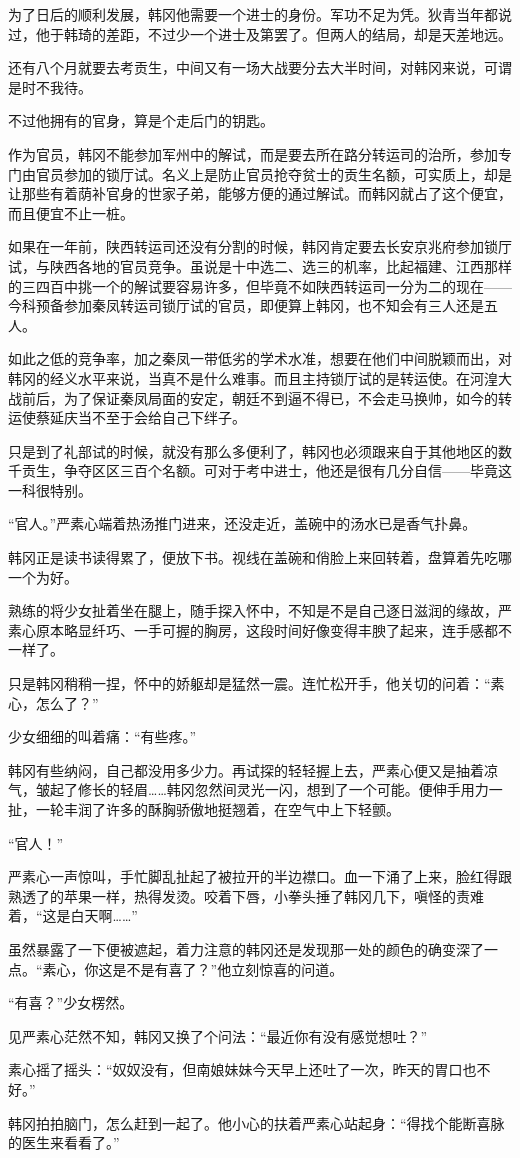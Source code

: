 为了日后的顺利发展，韩冈他需要一个进士的身份。军功不足为凭。狄青当年都说过，他于韩琦的差距，不过少一个进士及第罢了。但两人的结局，却是天差地远。

还有八个月就要去考贡生，中间又有一场大战要分去大半时间，对韩冈来说，可谓是时不我待。

不过他拥有的官身，算是个走后门的钥匙。

作为官员，韩冈不能参加军州中的解试，而是要去所在路分转运司的治所，参加专门由官员参加的锁厅试。名义上是防止官员抢夺贫士的贡生名额，可实质上，却是让那些有着荫补官身的世家子弟，能够方便的通过解试。而韩冈就占了这个便宜，而且便宜不止一桩。

如果在一年前，陕西转运司还没有分割的时候，韩冈肯定要去长安京兆府参加锁厅试，与陕西各地的官员竞争。虽说是十中选二、选三的机率，比起福建、江西那样的三四百中挑一个的解试要容易许多，但毕竟不如陕西转运司一分为二的现在——今科预备参加秦凤转运司锁厅试的官员，即便算上韩冈，也不知会有三人还是五人。

如此之低的竞争率，加之秦凤一带低劣的学术水准，想要在他们中间脱颖而出，对韩冈的经义水平来说，当真不是什么难事。而且主持锁厅试的是转运使。在河湟大战前后，为了保证秦凤局面的安定，朝廷不到逼不得已，不会走马换帅，如今的转运使蔡延庆当不至于会给自己下绊子。

只是到了礼部试的时候，就没有那么多便利了，韩冈也必须跟来自于其他地区的数千贡生，争夺区区三百个名额。可对于考中进士，他还是很有几分自信——毕竟这一科很特别。

“官人。”严素心端着热汤推门进来，还没走近，盖碗中的汤水已是香气扑鼻。

韩冈正是读书读得累了，便放下书。视线在盖碗和俏脸上来回转着，盘算着先吃哪一个为好。

熟练的将少女扯着坐在腿上，随手探入怀中，不知是不是自己逐日滋润的缘故，严素心原本略显纤巧、一手可握的胸房，这段时间好像变得丰腴了起来，连手感都不一样了。

只是韩冈稍稍一捏，怀中的娇躯却是猛然一震。连忙松开手，他关切的问着：“素心，怎么了？”

少女细细的叫着痛：“有些疼。”

韩冈有些纳闷，自己都没用多少力。再试探的轻轻握上去，严素心便又是抽着凉气，皱起了修长的轻眉……韩冈忽然间灵光一闪，想到了一个可能。便伸手用力一扯，一轮丰润了许多的酥胸骄傲地挺翘着，在空气中上下轻颤。

“官人！”

严素心一声惊叫，手忙脚乱扯起了被拉开的半边襟口。血一下涌了上来，脸红得跟熟透了的苹果一样，热得发烫。咬着下唇，小拳头捶了韩冈几下，嗔怪的责难着，“这是白天啊……”

虽然暴露了一下便被遮起，着力注意的韩冈还是发现那一处的颜色的确变深了一点。“素心，你这是不是有喜了？”他立刻惊喜的问道。

“有喜？”少女楞然。

见严素心茫然不知，韩冈又换了个问法：“最近你有没有感觉想吐？”

素心摇了摇头：“奴奴没有，但南娘妹妹今天早上还吐了一次，昨天的胃口也不好。”

韩冈拍拍脑门，怎么赶到一起了。他小心的扶着严素心站起身：“得找个能断喜脉的医生来看看了。”

